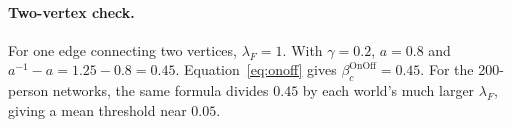 \documentclass[11pt]{article}
\begin{document}
\paragraph{Two-vertex check.}
For one edge connecting two vertices, $\lambda_F=1$. With
$\gamma=0.2$, $a=0.8$ and $a^{-1}-a=1.25-0.8=0.45$.
Equation~\eqref{eq:onoff} gives $\beta_c^{\mathrm{OnOff}}=0.45$.
For the 200-person networks, the same formula divides $0.45$ by each
world's much larger $\lambda_F$, giving a mean threshold near $0.05$.
\end{document}

